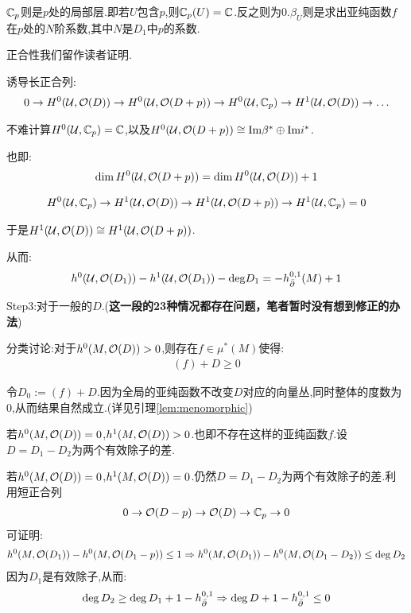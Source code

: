 $\mathbb{C}_p$则是$p$处的局部层.即若$U$包含$p$,则$\mathbb{C}_p(U)=\mathbb{C}$.反之则为$0$.$\beta_U$则是求出亚纯函数$f$在$p$处的$N$阶系数,其中$N$是$D_1$中$p$的系数.

正合性我们留作读者证明.

诱导长正合列:
\begin{align*}
	0 \to H^0(\mathcal{U},\mathcal{O}(D)) \to H^0(\mathcal{U},\mathcal{O}(D+p)) \to H^0(\mathcal{U},\mathbb{C}_p) \to H^1(\mathcal{U},\mathcal{O}(D)) \to \dots 
\end{align*}

不难计算$H^0(\mathcal{U},\mathbb{C}_p)=\mathbb{C}$,以及$H^0(\mathcal{U},\mathcal{O}(D+p))\cong \mathrm{Im}\beta^*\oplus \mathrm{Im}i^*$.

也即:
\begin{align*}
	\dim H^0(\mathcal{U},\mathcal{O}(D+p))=\dim H^0(\mathcal{U},\mathcal{O}(D))+1
\end{align*}

\begin{align*}
	H^0(\mathcal{U},\mathbb{C}_p) \to H^1(\mathcal{U},\mathcal{O}(D)) \to   H^1(\mathcal{U},\mathcal{O}(D+p)) \to H^1(\mathcal{U},\mathbb{C}_p)=0
\end{align*}

于是$H^1(\mathcal{U},\mathcal{O}(D)) \cong   H^1(\mathcal{U},\mathcal{O}(D+p))$.

从而:
\begin{align*}
	h^0(\mathcal{U},\mathcal{O}(D_1))-h^1(\mathcal{U},\mathcal{O}(D_1))-\mathrm{deg}D_1=-h^{0,1}_{\bar{\partial}}(M)+1
\end{align*}

Step3:对于一般的$D$.(\textbf{这一段的23种情况都存在问题，笔者暂时没有想到修正的办法})

分类讨论:对于$h^0(M,\mathcal{O}(D))>0$,则存在$f \in \mu^*(M)$使得:
\begin{align*}
	(f)+D\geq 0
\end{align*}

令$D_0:=(f)+D$.因为全局的亚纯函数不改变$D$对应的向量丛,同时整体的度数为$0$,从而结果自然成立.(详见引理\ref{lem:menomorphic})

若$h^0(M,\mathcal{O}(D))=0$,$h^1(M,\mathcal{O}(D))>0$.也即不存在这样的亚纯函数$f$.设$D=D_1-D_2$为两个有效除子的差.

若$h^0(M,\mathcal{O}(D))=0$,$h^1(M,\mathcal{O}(D))=0$.仍然$D=D_1-D_2$为两个有效除子的差.利用短正合列
\begin{align*}
	0 \to \mathcal{O}(D-p) \to \mathcal{O}(D) \to \mathbb{C}_p \to 0
\end{align*}
可证明:
\begin{align*}
	h^0(M,\mathcal{O}(D_1))-h^0(M,\mathcal{O}(D_1-p))\leq 1 \Rightarrow 
	h^0(M,\mathcal{O}(D_1))-h^0(M,\mathcal{O}(D_1-D_2))\leq \deg D_2
\end{align*}
因为$D_1$是有效除子,从而:
\begin{align*}
	\deg D_2\geq \deg D_1+1-h^{0,1}_{\bar{\partial}} \Rightarrow \deg D+1-h^{0,1}_{\bar{\partial}}\leq 0
\end{align*}

